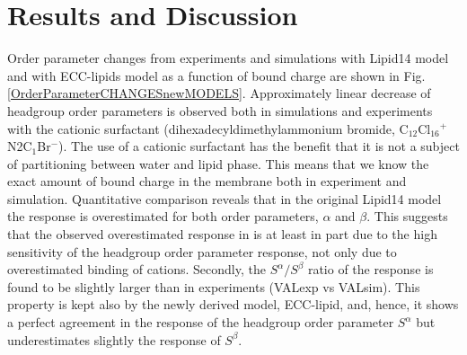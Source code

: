 \documentclass[aip,jcp,twocolumn]{revtex4}
\begin{document}
{\section{Results and Discussion}

Order parameter changes from experiments \cite{seelig87} and simulations with Lipid14 model and with ECC-lipids model 
as a function of bound charge are shown in Fig. \ref{OrderParameterCHANGESnewMODELS}. 
Approximately linear decrease of headgroup order parameters is observed both 
in simulations and experiments with the cationic surfactant (dihexadecyldimethylammonium bromide, C$_{12}$Cl$_{16}$$^+$N2C$_1$Br$^-$). 
The use of a cationic surfactant has the benefit that it is not a subject of partitioning between water and lipid phase. 
This means that we know the exact amount of bound charge in the membrane both in experiment and simulation. 
Quantitative comparison reveals that in the original Lipid14 model the response is overestimated for both order parameters, $\alpha$ and $\beta$. 
This suggests that the observed overestimated response in \cite{catte16} 
is at least in part due to the high sensitivity of the headgroup order parameter response, 
not only due to overestimated binding of cations. 
Secondly, the $S^\alpha/S^\beta$ ratio of the response is found to be slightly larger than in experiments (VALexp vs VALsim).
This property is kept also by the newly derived model, ECC-lipid, and, hence, 
it shows a perfect agreement in the response of the headgroup order parameter $S^\alpha$ 
but underestimates slightly the response of $S^\beta$. 



}
\end{document}
